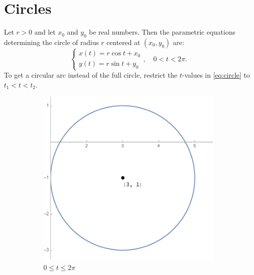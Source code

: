 \documentclass[12pt]{article}
\begin{document}
	\section*{Circles}
	Let $r>0$ and let $x_0$ and $y_0$ be real numbers. Then the parametric equations determining the circle of radius $r$ centered at $(x_0,y_0)$ are:
	\begin{equation}
	\label{eq:circle}
	\left\{
		\begin{array}{l}
		x(t)=r\cos{t}+x_0\\
		y(t)=r\sin{t}+y_0
		\end{array}
	\right.,\quad 0 < t < 2\pi.\end{equation}
	To get a circular arc instead of the full circle, restrict the $t$-values in \eqref{eq:circle} to $t_1<t<t_2$.
	\newpage
	\begin{figure}[h!]
		\centering
		\begin{subfigure}[t]{0.5\textwidth}
			\centering
			\includegraphics[scale=0.65]{2_Circles}
			\caption{$0\leq t\leq 2\pi$}
		\end{subfigure}%
		~ 
		\begin{subfigure}[t]{0.5\textwidth}
			\centering

\end{subfigure}
\end{figure}
\end{document}
